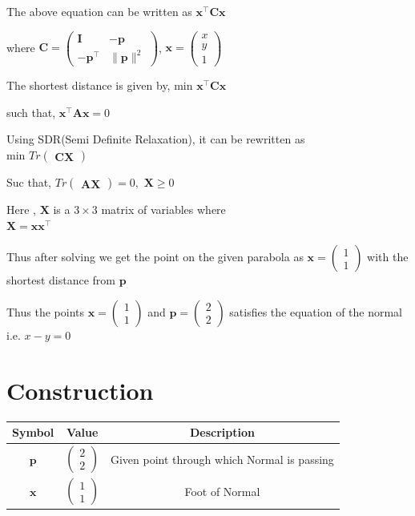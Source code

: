 \documentclass[journal,10pt,twocolumn]{article}
\let\vec\mathbf
\newcommand{\myvec}[1]{\ensuremath{\begin{pmatrix}#1\end{pmatrix}}}
\begin{document}
\begin{center}
The above equation can be written as $\vec{x^{\top}}\vec{C}\vec{x}$
\end{center}
\begin{center}
where $\vec{C} = \myvec{\vec{I}&-\vec{p}\\ -\vec{p^{\top}}& \|\vec{p}\|^2}$, $\vec{x} = \myvec{x\\y\\1}$
\end{center}
\begin{center}
The shortest distance is given by, min $\vec{x^{\top}}\vec{C}\vec{x}$
\end{center}
\begin{center}
such that,  $\vec{x^{\top}}\vec{A}\vec{x} = 0$
	\\ \raggedright Using SDR(Semi Definite Relaxation), it can be rewritten as 
	\\ \centering min $Tr\myvec{\vec{C}\vec{X}}$
\end{center}
\begin{center}
Suc that, $ Tr\myvec{\vec{A}\vec{X}} =0,$
 $\vec{X}\ge0$
\end{center}
\begin{center}
Here , $\vec{X}$ is a  $3\times3$ matrix of variables where
	\\ \centering $ \vec{X} = \vec{x}\vec{x^{\top}}$
\end{center}



Thus after solving we get the point on the given parabola as $\vec{x} = \myvec{1\\1}$ with the shortest distance from  $\vec{p}$
\begin{center}
    Thus the points $\vec{x} = \myvec{1\\1}$ and $\vec{p} = \myvec{2\\2}$ satisfies the equation of the normal i.e. $x-y=0$
\end{center} 

\section*{\large Construction}
{
\setlength\extrarowheight{5pt}
\begin{tabular}{|c|c|c|}
	\hline
	\textbf{Symbol}&\textbf{Value}&\textbf{Description}\\[5pt]
	\hline
	$\vec{p}$&$\myvec{2 \\ 2}$&Given point through which Normal is passing\\[5pt]
	\hline
	$\vec{x}$&$\myvec{1 \\ 1}$&Foot of Normal\\[5pt]
	\hline
\end{tabular}
}
\end{document}
